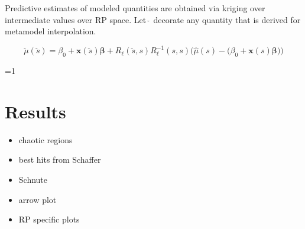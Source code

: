 \documentclass[12pt]{article}
\newcounter{alphasect}
\def\alphainsection{0}
\let\oldsection=\section
\def\section{%
  \ifnum\alphainsection=1%
    \addtocounter{alphasect}{1}
  \fi%
\oldsection}%
\begin{document}
{%
Predictive estimates of modeled quantities are obtained via kriging over 
intermediate values over RP space. Let $\check~$ decorate any quantity that is 
derived for metamodel interpolation.

\begin{equation}
	\check \mu(\check s) = \beta_0 + \bm{x}(\check s)\bm{\beta} + {R}_{\bm{\ell}}(\check s, s) {R}^{-1}_{\bm{\ell}}(s, s)\Big({\hat\mu}(s)-\big(\beta_0+\bm{x}(s)\bm{\beta}\big)\Big)
\end{equation}

%
}


%
\clearpage
\section{Results}

\begin{itemize}
	\item chaotic regions
	\item best hits from Schaffer
	\item Schnute
	\item arrow plot
	\item RP specific plots
\end{itemize}
\end{document}
